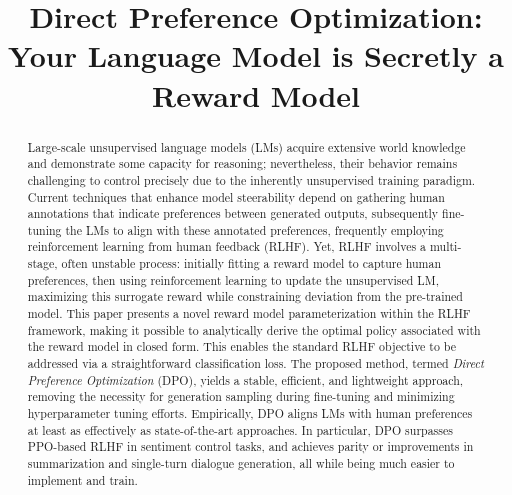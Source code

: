 \title{Direct Preference Optimization: Your Language Model is Secretly a Reward Model}

\begin{abstract}
Large-scale unsupervised language models (LMs) acquire extensive world knowledge and demonstrate some capacity for reasoning; nevertheless, their behavior remains challenging to control precisely due to the inherently unsupervised training paradigm. Current techniques that enhance model steerability depend on gathering human annotations that indicate preferences between generated outputs, subsequently fine-tuning the LMs to align with these annotated preferences, frequently employing reinforcement learning from human feedback (RLHF). Yet, RLHF involves a multi-stage, often unstable process: initially fitting a reward model to capture human preferences, then using reinforcement learning to update the unsupervised LM, maximizing this surrogate reward while constraining deviation from the pre-trained model. This paper presents a novel reward model parameterization within the RLHF framework, making it possible to analytically derive the optimal policy associated with the reward model in closed form. This enables the standard RLHF objective to be addressed via a straightforward classification loss. The proposed method, termed \textit{Direct Preference Optimization} (DPO), yields a stable, efficient, and lightweight approach, removing the necessity for generation sampling during fine-tuning and minimizing hyperparameter tuning efforts. Empirically, DPO aligns LMs with human preferences at least as effectively as state-of-the-art approaches. In particular, DPO surpasses PPO-based RLHF in sentiment control tasks, and achieves parity or improvements in summarization and single-turn dialogue generation, all while being much easier to implement and train.
\end{abstract}

